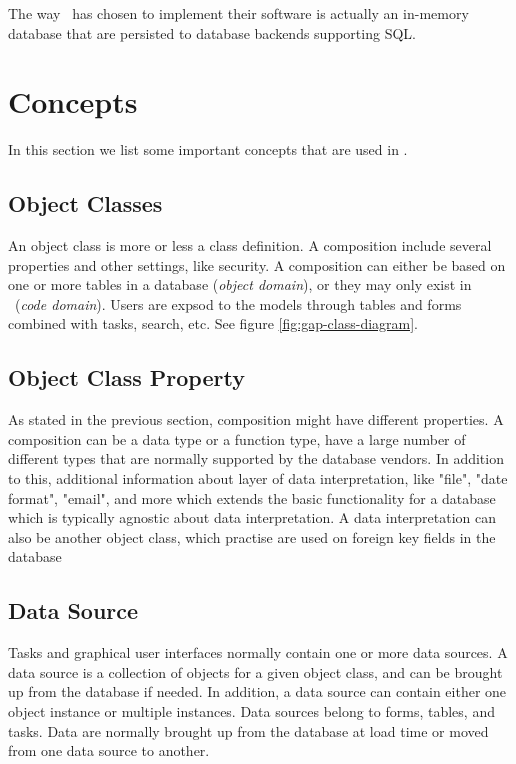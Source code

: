 The way \genus~has chosen to implement their software is actually an in-memory database that are persisted to database backends supporting SQL. 

\section{Concepts}
\label{sec:Concepts}
In this section we list some important concepts that are used in \gap.

\subsection{Object Classes}
An object class is more or less a class definition. A composition include several properties and other settings, like security. A composition can either be based on one or more tables in a database (\textit{object domain}), or they may only exist in \gap~(\textit{code domain}). Users are expsod to the models through tables and forms combined with tasks, search, etc. See figure \ref{fig:gap-class-diagram}.

\subsection{Object Class Property}
\label{sec:Object Class Property}
As stated in the previous section, composition might have different properties. A composition can be a data type or a function type, have a large number of different types that are normally supported by the database vendors. In addition to this, additional information about layer of data interpretation, like "file", "date format", "email", and more which extends the basic functionality for a database which is typically agnostic about data interpretation. A data interpretation can also be another object class, which practise are used on foreign key fields in the database

\subsection{Data Source}
\label{sub:Data Source}
Tasks and graphical user interfaces normally contain one or more data sources. A data source is a collection of objects for a given object class, and can be brought up from the database if needed. In addition, a data source can contain either one object instance or multiple instances. Data sources belong to forms, tables, and tasks. Data are normally brought up from the database at load time or moved from one data source to another. 

